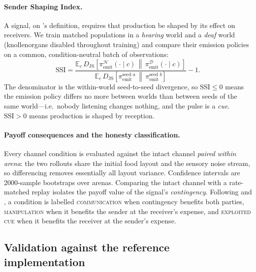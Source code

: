 \paragraph{Sender Shaping Index.}
A signal, on \citeauthor{scottphillips2008defining}'s definition, requires that
production be shaped by its effect on receivers. We train matched populations in a
\emph{hearing} world and a \emph{deaf} world (knollenorgans disabled throughout
training) and compare their emission policies on a common, condition-neutral batch
of observations:
\begin{equation}
\mathrm{SSI} = \frac{\mathbb{E}_{c}\,
  D_{\mathrm{JS}}\!\left[\pi^{\mathcal{H}}_{\text{emit}}(\cdot\mid c)\,\middle\|\,
                          \pi^{\mathcal{D}}_{\text{emit}}(\cdot\mid c)\right]}
{\mathbb{E}_{c}\, D_{\mathrm{JS}}\!\left[\pi^{\text{seed }a}_{\text{emit}}\,\middle\|\,
                          \pi^{\text{seed }b}_{\text{emit}}\right]} - 1 .
\label{eq:ssi}
\end{equation}
The denominator is the within-world seed-to-seed divergence, so $\mathrm{SSI}\le0$
means the emission policy differs no more between worlds than between seeds of the
same world---i.e.\ nobody listening changes nothing, and the pulse is a
\emph{cue}. $\mathrm{SSI}>0$ means production is shaped by reception.

\paragraph{Payoff consequences and the honesty classification.}
Every channel condition is evaluated against the intact channel \emph{paired
within arena}: the two rollouts share the initial food layout and the sensory
noise stream, so differencing removes essentially all layout variance. Confidence
intervals are 2000-sample bootstraps over arenas. Comparing the intact channel
with a rate-matched replay isolates the payoff value of the signal's
\emph{contingency}. Following \citet{maynardsmith2003animal} and
\citet{dawkins1978animal}, a condition is labelled \textsc{communication} when
contingency benefits both parties, \textsc{manipulation} when it benefits the
sender at the receiver's expense, and \textsc{exploited cue} when it benefits the
receiver at the sender's expense.

\subsection{Validation against the reference implementation}
\label{sec:validation}

